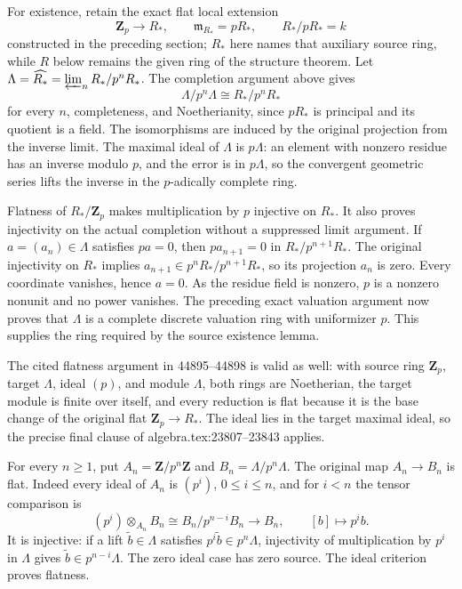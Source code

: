 For existence, retain the exact flat local extension \[
 \mathbf Z_p\longrightarrow R_*,\qquad
 \mathfrak m_{R_*}=pR_*,\qquad R_*/pR_*=k
\] constructed in the preceding section; \(R_*\) here names that auxiliary source ring, while \(R\) below remains the given ring of the structure theorem. Let \(\Lambda=\widehat{R_*}=\varprojlim_n R_*/p^nR_*\). The completion argument above gives \[
 \Lambda/p^n\Lambda\cong R_*/p^nR_*
\] for every \(n\), completeness, and Noetherianity, since \(pR_*\) is principal and its quotient is a field. The isomorphisms are induced by the original projection from the inverse limit. The maximal ideal of \(\Lambda\) is \(p\Lambda\): an element with nonzero residue has an inverse modulo \(p\), and the error is in \(p\Lambda\), so the convergent geometric series lifts the inverse in the \(p\)-adically complete ring.

Flatness of \(R_*/\mathbf Z_p\) makes multiplication by \(p\) injective on \(R_*\). It also proves injectivity on the actual completion without a suppressed limit argument. If \(a=(a_n)\in\Lambda\) satisfies \(pa=0\), then \(pa_{n+1}=0\) in \(R_*/p^{n+1}R_*\). The original injectivity on \(R_*\) implies \(a_{n+1}\in p^nR_*/p^{n+1}R_*\), so its projection \(a_n\) is zero. Every coordinate vanishes, hence \(a=0\). As the residue field is nonzero, \(p\) is a nonzero nonunit and no power vanishes. The preceding exact valuation argument now proves that \(\Lambda\) is a complete discrete valuation ring with uniformizer \(p\). This supplies the ring required by the source existence lemma.

The cited flatness argument in 44895--44898 is valid as well: with source ring \(\mathbf Z_p\), target \(\Lambda\), ideal \((p)\), and module \(\Lambda\), both rings are Noetherian, the target module is finite over itself, and every reduction is flat because it is the base change of the original flat \(\mathbf Z_p\to R_*\). The ideal lies in the target maximal ideal, so the precise final clause of algebra.tex:23807--23843 applies.

For every \(n\geq1\), put \(A_n=\mathbf Z/p^n\mathbf Z\) and \(B_n=\Lambda/p^n\Lambda\). The original map \(A_n\to B_n\) is flat. Indeed every ideal of \(A_n\) is \((p^i)\), \(0\leq i\leq n\), and for \(i<n\) the tensor comparison is \[
 (p^i)\otimes_{A_n}B_n
   \cong B_n/p^{n-i}B_n
   \longrightarrow B_n,\qquad [b]\longmapsto p^ib.
\] It is injective: if a lift \(\widetilde b\in\Lambda\) satisfies \(p^i\widetilde b\in p^n\Lambda\), injectivity of multiplication by \(p^i\) in \(\Lambda\) gives \(\widetilde b\in p^{n-i}\Lambda\). The zero ideal case has zero source. The ideal criterion proves flatness.

